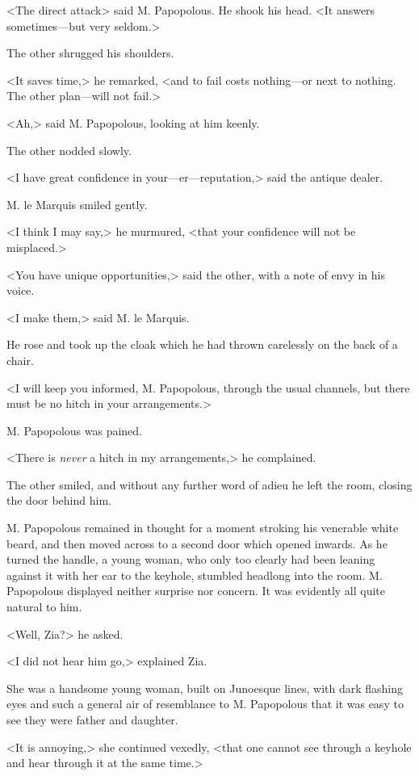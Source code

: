 <The direct attack\longdash> said M. Papopolous. He shook his head. <It answers sometimes—but very seldom.>

The other shrugged his shoulders.

<It saves time,> he remarked, <and to fail costs nothing—or next to nothing. The other plan—will not fail.>

<Ah,> said M. Papopolous, looking at him keenly.

The other nodded slowly.

<I have great confidence in your—er—reputation,> said the antique dealer.

M. le Marquis smiled gently.

<I think I may say,> he murmured, <that your confidence will not be misplaced.>

<You have unique opportunities,> said the other, with a note of envy in his voice.

<I make them,> said M. le Marquis.

He rose and took up the cloak which he had thrown carelessly on the back of a chair.

<I will keep you informed, M. Papopolous, through the usual channels, but there must be no hitch in your arrangements.>

M. Papopolous was pained.

<There is \emph{never} a hitch in my arrangements,> he complained.

The other smiled, and without any further word of adieu he left the room, closing the door behind him.

M. Papopolous remained in thought for a moment stroking his venerable white beard, and then moved across to a second door which opened inwards. As he turned the handle, a young woman, who only too clearly had been leaning against it with her ear to the keyhole, stumbled headlong into the room. M. Papopolous displayed neither surprise nor concern. It was evidently all quite natural to him.

<Well, Zia?> he asked.

<I did not hear him go,> explained Zia.

She was a handsome young woman, built on Junoesque lines, with dark flashing eyes and such a general air of resemblance to M. Papopolous that it was easy to see they were father and daughter.

<It is annoying,> she continued vexedly, <that one cannot see through a keyhole and hear through it at the same time.>

